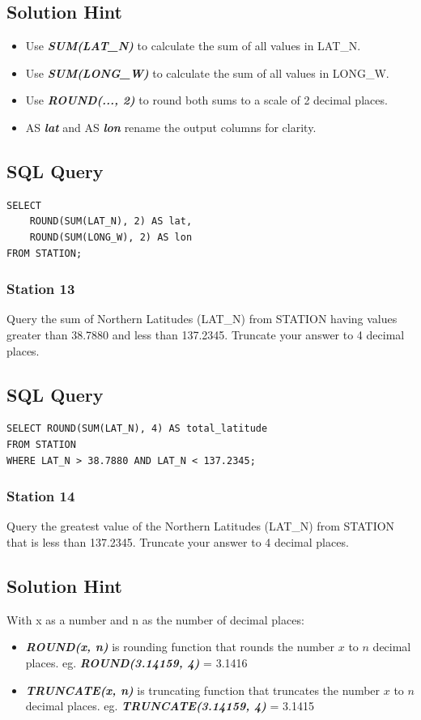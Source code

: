 \documentclass[12pt,a4paper]{article}
\begin{document}
\subsection*{Solution Hint}
\begin{itemize}
    \item Use \textit{\textbf{SUM(LAT\_N)}} to calculate the sum of all values in LAT\_N.
    \item Use \textit{\textbf{SUM(LONG\_W)}} to calculate the sum of all values in LONG\_W.
    \item Use \textit{\textbf{ROUND(..., 2)}} to round both sums to a scale of 2 decimal places.
    \item AS \textit{\textbf{lat}} and AS \textit{\textbf{lon}} rename the output columns for clarity.
\end{itemize}
\subsection*{SQL Query}
\begin{lstlisting}[style=sqlstyle]
SELECT
    ROUND(SUM(LAT_N), 2) AS lat,
    ROUND(SUM(LONG_W), 2) AS lon
FROM STATION;
\end{lstlisting}
\subsubsection{Station 13}
Query the sum of Northern Latitudes (LAT\_N) from STATION having values greater than 38.7880 and less than 137.2345. Truncate your answer to 4 decimal places.

\subsection*{SQL Query}
\begin{lstlisting}[style=sqlstyle]
SELECT ROUND(SUM(LAT_N), 4) AS total_latitude
FROM STATION
WHERE LAT_N > 38.7880 AND LAT_N < 137.2345;
\end{lstlisting}
\subsubsection{Station 14}
Query the greatest value of the Northern Latitudes (LAT\_N) from STATION that is less than 137.2345. Truncate your answer to 4 decimal places.
\subsection*{Solution Hint}
With x as a number and n as the number of decimal places:
\begin{itemize}
    \item \textit{\textbf{ROUND(x, n)}} is rounding function that rounds the number \(x\) to \(n\) decimal places. eg. \textit{\textbf{ROUND(3.14159, 4)}} = 3.1416
    \item \textit{\textbf{TRUNCATE(x, n)}} is truncating function that truncates the number \(x\) to \(n\) decimal places. eg. \textit{\textbf{TRUNCATE(3.14159, 4)}} = 3.1415
\end{itemize}
\end{document}
